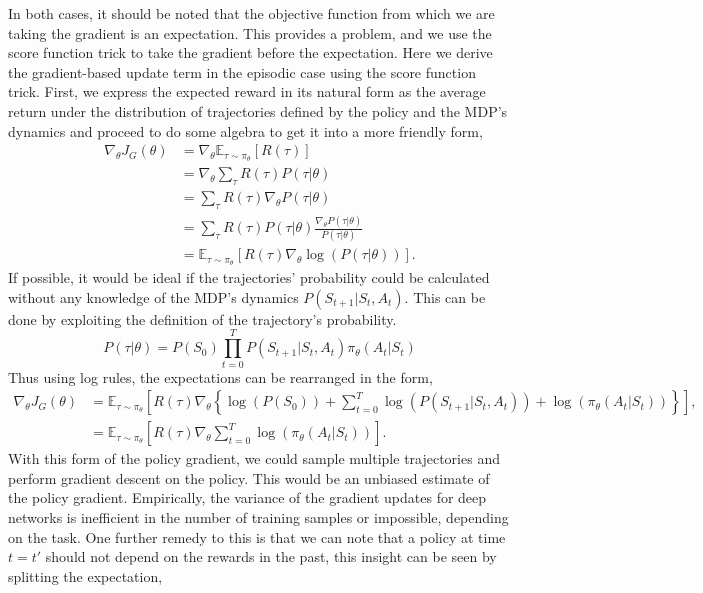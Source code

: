 In both cases, it should be noted that the objective function from which we are taking the gradient is an expectation. This provides a problem, and we use the score function trick to take the gradient before the expectation.
Here we derive the gradient-based update term in the episodic case using the score function trick. First, we express the expected reward in its natural form as the average return under the distribution of trajectories defined by the policy and the MDP's dynamics and proceed to do some algebra to get it into a more friendly form,
\begin{align}
	\nabla_\theta J_G(\theta) & = \nabla_\theta \mathbb{E}_{\tau \sim \pi_\theta}\left[R(\tau)\right]                            \\
	                          & = \nabla_\theta \sum_\tau R(\tau) P(\tau|\theta)                                                 \\
	                          & = \sum_\tau R(\tau) \nabla_\theta P(\tau | \theta)                                               \\
	                          & = \sum_\tau R(\tau) P(\tau | \theta) \frac{\nabla_\theta P(\tau | \theta)}{P(\tau |\theta)}      \\
	                          & = \mathbb{E}_{\tau \sim \pi_{\theta}} \left[ R(\tau) \nabla_\theta \log(P(\tau| \theta))\right].
\end{align}
If possible, it would be ideal if the trajectories' probability could be calculated without any knowledge of the MDP's dynamics $P(S_{t+1}| S_t, A_t)$. This can be done by exploiting the definition of the trajectory's probability.
\begin{equation}
	P(\tau|\theta) = P(S_0) \prod_{t=0}^ TP(S_{t+1}| S_t, A_t)\pi_\theta(A_{t}|S_{t})
\end{equation}
Thus using log rules, the expectations can be rearranged in the form,
\begin{align}
	\nabla_\theta J_G(\theta) & = \mathbb{E}_{\tau \sim \pi_{\theta}} \left[ R(\tau) \nabla_\theta \left\{ \log(P(S_0)) +  \sum_{t=0}^ T \log(P(S_{t+1}| S_t, A_t))+ \log(\pi_\theta(A_t|S_t))\right\} \right], \\
	                          & = \mathbb{E}_{\tau \sim \pi_{\theta}} \left[ R(\tau) \nabla_\theta \sum_{t=0}^ T \log(\pi_\theta(A_t|S_t))\right].
\end{align}
With this form of the policy gradient, we could sample multiple trajectories and perform gradient descent on the policy. This would be an unbiased estimate of the policy gradient. Empirically, the variance of the gradient updates for deep networks is inefficient in the number of training samples or impossible, depending on the task. One further remedy to this is that we can note that a policy at time $t = t'$ should not depend on the rewards in the past, this insight can be seen by splitting the expectation,
